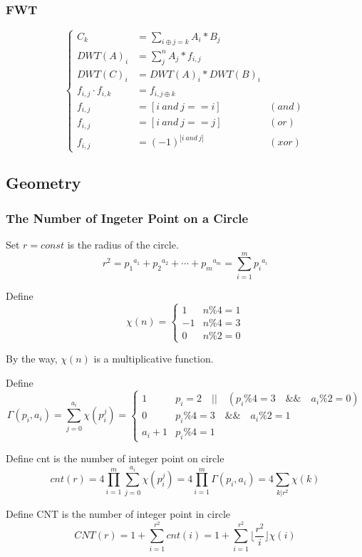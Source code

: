 \documentclass[10pt]{ctexart}
\begin{document}
{{\subsubsection{FWT}
\begin{equation*}
\left\{
    \begin{aligned}
        C_k&=\sum_{i\oplus j=k}A_i*B_j \\
        DWT(A)_i&=\sum_j^nA_j*f_{i,j} \\
        DWT(C)_i&=DWT(A)_i*DWT(B)_i\\
        f_{i,j} \cdot f_{i,k} &=f_{i,j\oplus k}\\
        f_{i,j} &= [i \ and \ j == i] \  &(and)\\
        f_{i,j} &= [i \  and \  j == j] \ &(or)\\
        f_{i,j} &= (-1)^{| i \  and \  j |} \ &(xor)
    \end{aligned}
\right.
\end{equation*}
\subsection{Geometry}
\subsubsection{The Number of Ingeter Point on a Circle}
Set $r = const$ is the radius of the circle.
$$r^2 = {p_1}^{a_1} + {p_2}^{a_2} + \cdots + {p_m}^{a_m} = \sum_{i = 1}^{m} {p_i}^{a_i}$$
\par 
Define
\[
    \chi(n)=
    \begin{cases}
        1 & {n \% 4 = 1} \\
        -1 & {n \% 4 = 3} \\
        0 & {n \% 2 = 0}
    \end{cases}
\]
\par
By the way, $\chi(n)$ is a multiplicative function. 
\par
Define
\[
    \Gamma(p_i,a_i)=\sum_{j = 0}^{a_i}\chi(p_i^j)=
    \begin{cases}
        1 & {p_i = 2 \quad || \quad (p_i \% 4 = 3 \quad \&\& \quad a_i \% 2 = 0)} \\
        0 & {p_i \% 4 = 3 \quad \&\& \quad a_i \% 2 = 1} \\
        a_i + 1 & {p_i \% 4 = 1}
    \end{cases}
\]
\par
Define cnt is the number of integer point on circle
$$cnt(r) = 4 \prod_{i = 1}^{m} \sum_{j = 0}^{a_i} \chi(p_i^j) = 4 \prod_{i = 1}^{m} \Gamma(p_i,a_i) = 4 \sum_{k | r^2}\chi(k)$$
\par
Define CNT is the number of integer point in circle
$$CNT(r) = 1 + \sum_{i = 1}^{r^2}cnt(i) = 1 + \sum_{i = 1}^{r^2} \lfloor \frac{r^2}{i} \rfloor \chi(i)$$
}}
\end{document}
